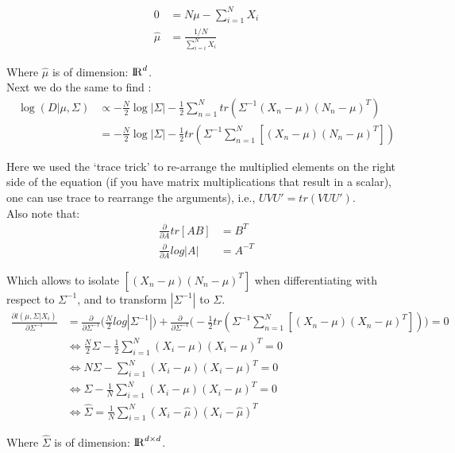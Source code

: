 \documentclass{amsart}
\theoremstyle{definition}
\theoremstyle{remark}
\numberwithin{equation}{section}
\begin{document}
\begin{equation}
    \begin{align}
    0 &= N \mu - \sum_{i=1}^{N}X_i \\
    \hat\mu & = \frac{1/N}{\sum_{i=i}^{N}X_i}
    \end{align}
\end{equation}

Where $\hat\mu$ is of dimension: ${\rm I\!R}^d$. \\

Next we do the same to find \hat{\Sigma}: \\

\begin{equation}
    \begin{align}
    \log (D | \mu, \Sigma) & \propto -\frac{N}{2} \log|\Sigma| -\frac{1}{2} \sum_{n=1}^{N} tr(\Sigma^{-1}(X_n-\mu)(N_n-\mu)^T) \\
    & = -\frac{N}{2} \log|\Sigma| -\frac{1}{2}tr(\Sigma^{-1} \sum_{n=1}^{N} [(X_n-\mu)(N_n-\mu)^T])
    \end{align}
\end{equation}

Here we used the `trace trick' to re-arrange the multiplied elements on the right
side of the equation (if you have matrix multiplications that result in a scalar),
one can use trace to rearrange the arguments), i.e., $UVU' = tr(VUU')$. \\

Also note that:\\

\begin{equation}
    \begin{align}
    \frac{\partial}{\partial A} tr[AB] & = B^T \\
    \frac{\partial}{\partial A} log|A| & = A^{-T}
    \end{align}
\end{equation}

Which allows to isolate $[(X_n-\mu)(N_n-\mu)^T]$ when differentiating with 
respect to $\Sigma^{-1}$, and to transform $|\Sigma^{-1}|$ to $\Sigma$. \\

\begin{equation}
    \begin{align}
    \frac{\partial l(\mu, \Sigma|X_i)}{\partial\Sigma^{-1}} & = 
        \frac{\partial}{\partial\Sigma^{-1}}\big(\frac{N}{2}log|\Sigma^{-1}|\big) + 
        \frac{\partial}{\partial\Sigma^{-1}}\big(-\frac{1}{2}tr(\Sigma^{-1}\sum_{n=1}^{N}[(X_n-\mu)(X_n-\mu)^T])\big) = 0 \\
    & \Leftrightarrow \frac{N}{2} \Sigma -\frac{1}{2}\sum_{i=1}^{N}(X_i-\mu)(X_i-\mu)^T = 0 \\
    & \Leftrightarrow N\Sigma - \sum_{i=1}^{N}(X_i-\mu)(X_i-\mu)^T = 0 \\
    & \Leftrightarrow \Sigma - \frac{1}{N}\sum_{i=1}^{N}(X_i-\mu)(X_i-\mu)^T = 0 \\
    & \Leftrightarrow \hat\Sigma = \frac{1}{N}\sum_{i=1}^{N}(X_i-\hat\mu)(X_i-\hat\mu)^T 
    \end{align}
\end{equation}

Where $\hat\Sigma$ is of dimension: ${\rm I\!R}^{d \times d}$. 
\end{document}
